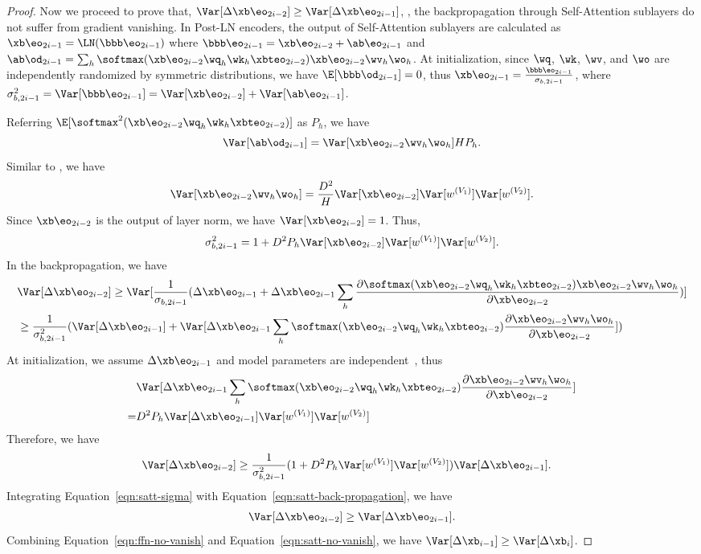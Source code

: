 \begin{proof}
Now we proceed to prove that, $\Var[\Delta \xb\eo_{2i-2}] \geq \Var[\Delta \xb\eo_{2i-1}]$, \ie, the backpropagation through Self-Attention sublayers do not suffer from gradient vanishing. 
In Post-LN encoders, the output of Self-Attention sublayers are calculated as 
$\xb\eo_{2i-1} = \LN(\bbb\eo_{2i-1})$ where $\bbb\eo_{2i-1} = \xb\eo_{2i-2} + \ab\eo_{2i-1}$ and $\ab\od_{2i-1} = \sum_{h} \softmax(\xb\eo_{2i-2} \wq_h \wk_h \xbteo_{2i-2})\xb\eo_{2i-2} \wv_h \wo_h$. 
At initialization, since $\wq$, $\wk$, $\wv$, and $\wo$ are independently randomized by symmetric distributions, we have $\E[\bbb\od_{2i-1}] = 0$, thus $\xb\eo_{2i-1} = \frac{\bbb\eo_{2i-1}}{\sigma_{b, 2i-1}}$, where $\sigma^2_{b, 2i-1} = \Var[\bbb\eo_{2i-1}] =  \Var[\xb\eo_{2i-2}] + \Var[\ab\eo_{2i-1}]$.

Referring $\E[\softmax^2(\xb\eo_{2i-2} \wq_h \wk_h \xbteo_{2i-2})]$ as $P_h$, we have 
$$
\Var[\ab\od_{2i-1}] = \Var[\xb\eo_{2i-2} \wv_h \wo_h] H P_h.
$$
Similar to \citet{He2015DelvingDI}, we have
$$
\Var[\xb\eo_{2i-2} \wv_h \wo_h] = \frac{D^2}{H} \Var[\xb\eo_{2i-2}] \Var[w^{(V_1)}] \Var[w^{(V_2)}].
$$
Since $\xb\eo_{2i-2}$ is the output of layer norm, we have $\Var[\xb\eo_{2i-2}] = 1$. Thus, 
\begin{align}
\sigma^2_{b, 2i-1} = 1 + D^2 P_h \Var[\xb\eo_{2i-2}] \Var[w^{(V_1)}] \Var[w^{(V_2)}].
\label{eqn:satt-sigma}
\end{align}
In the backpropagation, we have
\begin{align*}
& \Var[\Delta \xb\eo_{2i-2}] \geq \Var[\frac{1}{\sigma_{b, 2i-1}} (\Delta \xb\eo_{2i-1} + \Delta \xb\eo_{2i-1} \sum_h \frac{\partial\softmax(\xb\eo_{2i-2} \wq_h \wk_h \xbteo_{2i-2})\xb\eo_{2i-2} \wv_h \wo_h}{\partial \xb\eo_{2i-2}})] \\
&\geq \frac{1}{\sigma^2_{b, 2i-1}}(\Var[\Delta \xb\eo_{2i-1}] + \Var[\Delta \xb\eo_{2i-1} \sum_h \softmax(\xb\eo_{2i-2} \wq_h \wk_h \xbteo_{2i-2})\frac{\partial\xb\eo_{2i-2} \wv_h \wo_h}{\partial \xb\eo_{2i-2}} ])
\end{align*}
At initialization, we assume $\Delta \xb\eo_{2i-1}$ and model parameters are independent~\cite{He2015DelvingDI}, thus
\begin{align*}
& \Var[\Delta \xb\eo_{2i-1} \sum_h \softmax(\xb\eo_{2i-2} \wq_h \wk_h \xbteo_{2i-2})\frac{\partial\xb\eo_{2i-2} \wv_h \wo_h}{\partial \xb\eo_{2i-2}}] \\
=&  D^2 P_h \Var[\Delta \xb\eo_{2i-1}] \Var[w^{(V_1)}] \Var[w^{(V_2)}]
\end{align*}
Therefore, we have
\begin{align}
\Var[\Delta \xb\eo_{2i-2}]& \geq  \frac{1}{\sigma^2_{b, 2i-1}} (1 + D^2 P_h \Var[w^{(V_1)}] \Var[w^{(V_2)}]) \Var[\Delta \xb\eo_{2i-1}].
\label{eqn:satt-back-propagation}
\end{align}
Integrating Equation~\ref{eqn:satt-sigma} with Equation~\ref{eqn:satt-back-propagation}, we have
\begin{align}
\Var[\Delta \xb\eo_{2i-2}] \geq \Var[\Delta \xb\eo_{2i-1}].
\label{eqn:satt-no-vanish}
\end{align}
Combining Equation~\ref{eqn:ffn-no-vanish} and Equation~\ref{eqn:satt-no-vanish}, we have $\Var[\Delta \xb_{i-1}] \geq \Var[\Delta \xb_{i}]$.
\end{proof}
